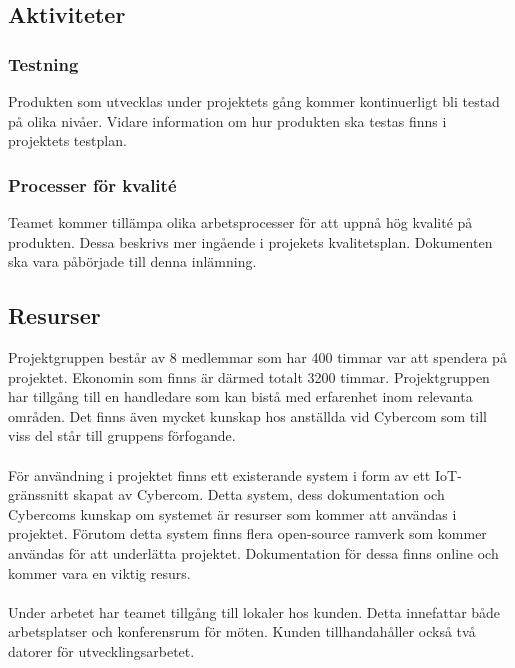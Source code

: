 \subsection{Aktiviteter}

\subsubsection*{Testning}
Produkten som utvecklas under projektets gång kommer kontinuerligt bli testad på olika nivåer. Vidare information om hur produkten ska testas finns i projektets testplan\cite{bib-testplan}.

\subsubsection*{Processer för kvalité}
Teamet kommer tillämpa olika arbetsprocesser för att uppnå hög kvalité på produkten. Dessa beskrivs mer ingående i projekets kvalitetsplan\cite{bib-kvalitetsplan}.
Dokumenten ska vara påbörjade till denna inlämning.

\subsection{Resurser}
Projektgruppen består av 8 medlemmar som har 400 timmar var att spendera på projektet. Ekonomin som finns är därmed totalt 3200 timmar. Projektgruppen har tillgång till en handledare som kan bistå med erfarenhet inom relevanta områden. Det finns även mycket kunskap hos anställda vid Cybercom som till viss del står till gruppens förfogande.\\
\\
För användning i projektet finns ett existerande system i form av ett IoT-gränssnitt skapat av Cybercom. Detta system,
dess dokumentation och Cybercoms kunskap om systemet är resurser som kommer att användas i projektet. Förutom detta
system finns flera open-source ramverk som kommer användas för att underlätta projektet. Dokumentation för dessa finns online och kommer vara en viktig resurs.\\
\\
Under arbetet har teamet tillgång till lokaler hos kunden. Detta innefattar både arbetsplatser och konferensrum för möten. Kunden tillhandahåller också två datorer för utvecklingsarbetet. \\

\pagebreak
